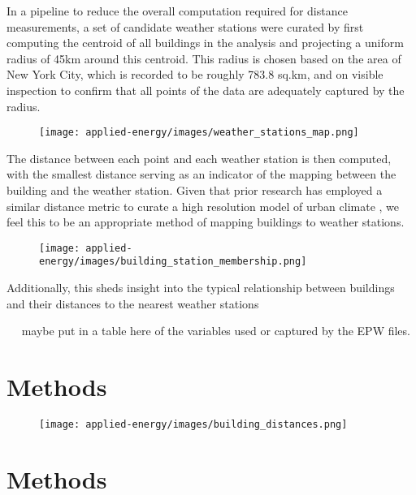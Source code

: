 \documentclass[preprint,review,12pt]{elsarticle}
\begin{document}
\begin{linenumbers}
In a pipeline to reduce the overall computation required for distance measurements, a set of candidate weather stations were curated by first computing the centroid of all buildings in the analysis and projecting a uniform radius of 45km around this centroid. This radius is chosen based on the area of New York City, which is recorded to be roughly 783.8 sq.km, and on visible inspection to confirm that all points of the data are adequately captured by the radius.

\begin{figure}[h]
    \texttt{[image: applied-energy/images/weather\_stations\_map.png]}
\end{figure}

The distance between each point and each weather station is then computed, with the smallest distance serving as an indicator of the mapping between the building and the weather station. Given that prior research has employed a similar distance metric to curate a high resolution model of urban climate \cite{hong_urban_2021}, we feel this to be an appropriate method of mapping buildings to weather stations.

\begin{figure}[h]
    \texttt{[image: applied-energy/images/building\_station\_membership.png]}
\end{figure}

Additionally, this sheds insight into the typical relationship between buildings and their distances to the nearest weather stations


~~ maybe put in a table here of the variables used or captured by the EPW files.

\section{Methods}



\begin{figure}[h]
    \texttt{[image: applied-energy/images/building\_distances.png]}
\end{figure}

\section{Methods}

\end{linenumbers}


\end{document}
